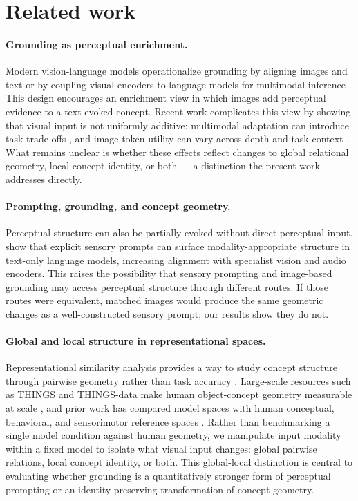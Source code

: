 \documentclass{article}
\begin{document}
\section{Related work}

\paragraph{Grounding as perceptual enrichment.}
Modern vision-language models operationalize grounding by aligning images and text or by coupling visual encoders to language models for multimodal inference \citep{radford2021clip,li2023blip2}. This design encourages an enrichment view in which images add perceptual evidence to a text-evoked concept. Recent work complicates this view by showing that visual input is not uniformly additive: multimodal adaptation can introduce task trade-offs \citep{ratzlaff2025trainingfree}, and image-token utility can vary across depth and task context \citep{ghosh2026image_tokens}. What remains unclear is whether these effects reflect changes to global relational geometry, local concept identity, or both --- a distinction the present work addresses directly.

\paragraph{Prompting, grounding, and concept geometry.}
Perceptual structure can also be partially evoked without direct perceptual input. \citet{wang2025words} show that explicit sensory prompts can surface modality-appropriate structure in text-only language models, increasing alignment with specialist vision and audio encoders. This raises the possibility that sensory prompting and image-based grounding may access perceptual structure through different routes. If those routes were equivalent, matched images would produce the same geometric changes as a well-constructed sensory prompt; our results show they do not.

\paragraph{Global and local structure in representational spaces.}
Representational similarity analysis provides a way to study concept structure through pairwise geometry rather than task accuracy \citep{kriegeskorte2008rsa}. Large-scale resources such as THINGS and THINGS-data make human object-concept geometry measurable at scale \citep{hebart2020things,hebart2023thingsdata}, and prior work has compared model spaces with human conceptual, behavioral, and sensorimotor reference spaces \citep{hebart2020multidimensional,muttenthaler2025aligning,xu2025ungrounded}. Rather than benchmarking a single model condition against human geometry, we manipulate input modality within a fixed model to isolate what visual input changes: global pairwise relations, local concept identity, or both. This global-local distinction is central to evaluating whether grounding is a quantitatively stronger form of perceptual prompting or an identity-preserving transformation of concept geometry.
\end{document}

